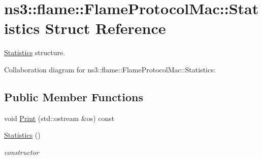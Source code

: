 \hypertarget{structns3_1_1flame_1_1FlameProtocolMac_1_1Statistics}{}\section{ns3\+:\+:flame\+:\+:Flame\+Protocol\+Mac\+:\+:Statistics Struct Reference}
\label{structns3_1_1flame_1_1FlameProtocolMac_1_1Statistics}


\hyperlink{structns3_1_1flame_1_1FlameProtocolMac_1_1Statistics}{Statistics} structure.  




Collaboration diagram for ns3\+:\+:flame\+:\+:Flame\+Protocol\+Mac\+:\+:Statistics\+:
\subsection*{Public Member Functions}
\begin{DoxyCompactItemize}
\item 
void \hyperlink{structns3_1_1flame_1_1FlameProtocolMac_1_1Statistics_af4c278fd1f6dd282635c402d6e542179}{Print} (std\+::ostream \&os) const 
\item 
\hyperlink{structns3_1_1flame_1_1FlameProtocolMac_1_1Statistics_ac3ad1a23cea8e0ccbf4a9325ab702a4a}{Statistics} ()
\begin{DoxyCompactList}\small\item\em constructor \end{DoxyCompactList}\end{DoxyCompactItemize}

